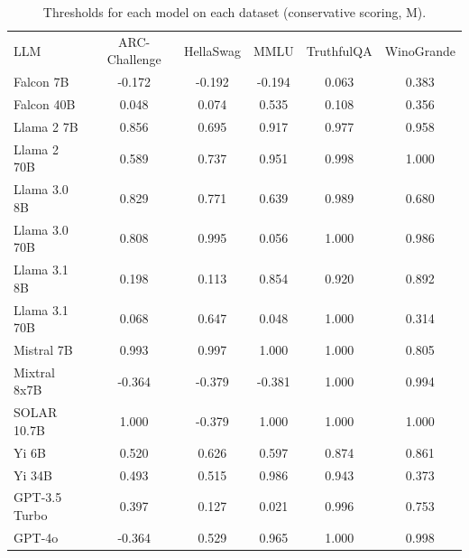 \begin{table}[h]
\caption{Thresholds for each model on each dataset (conservative scoring, M). }
\label{tab:thresholds_prob_entropy_k20_w2}
\centering
\begin{tabular}{l S[table-format=3.1] S[table-format=3.1] S[table-format=3.1] S[table-format=3.1] S[table-format=3.1]}
\toprule
LLM & ARC-Challenge & HellaSwag & MMLU & TruthfulQA & WinoGrande \\ 
\cmidrule(lr){1-1} \cmidrule(lr){2-2} \cmidrule(lr){3-3} \cmidrule(lr){4-4} \cmidrule(lr){5-5} \cmidrule(lr){6-6}
Falcon 7B & -0.172 & -0.192 & -0.194 & 0.063 & 0.383\\
Falcon 40B & 0.048 & 0.074 & 0.535 & 0.108 & 0.356\\
Llama 2 7B & 0.856 & 0.695 & 0.917 & 0.977 & 0.958\\
Llama 2 70B & 0.589 & 0.737 & 0.951 & 0.998 & 1.000\\
Llama 3.0 8B & 0.829 & 0.771 & 0.639 & 0.989 & 0.680\\
Llama 3.0 70B & 0.808 & 0.995 & 0.056 & 1.000 & 0.986\\
Llama 3.1 8B & 0.198 & 0.113 & 0.854 & 0.920 & 0.892\\
Llama 3.1 70B & 0.068 & 0.647 & 0.048 & 1.000 & 0.314\\
Mistral 7B & 0.993 & 0.997 & 1.000 & 1.000 & 0.805\\
Mixtral 8x7B & -0.364 & -0.379 & -0.381 & 1.000 & 0.994\\
SOLAR 10.7B & 1.000 & -0.379 & 1.000 & 1.000 & 1.000\\
Yi 6B & 0.520 & 0.626 & 0.597 & 0.874 & 0.861\\
Yi 34B & 0.493 & 0.515 & 0.986 & 0.943 & 0.373\\
GPT-3.5 Turbo & 0.397 & 0.127 & 0.021 & 0.996 & 0.753\\
GPT-4o & -0.364 & 0.529 & 0.965 & 1.000 & 0.998\\
\bottomrule
\end{tabular}
\end{table}
